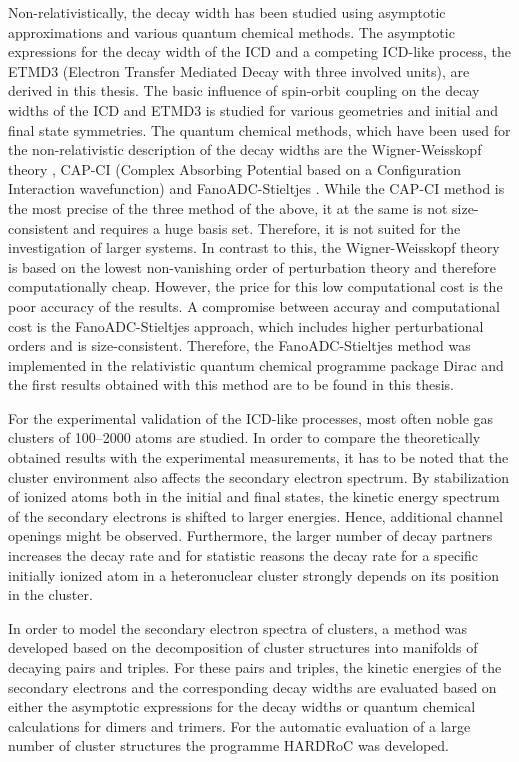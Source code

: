 Non-relativistically, the decay width has been studied using asymptotic
approximations \cite{Gokhberg10_1} and various quantum chemical methods.
The asymptotic expressions for the decay width of the \ac{ICD} and a competing
\ac{ICD}-like process, the ETMD3 (Electron Transfer Mediated Decay with three
involved units), are derived in this thesis. The basic influence of
spin-orbit coupling on the decay widths of the \ac{ICD} and ETMD3 is studied
for various geometries and initial and final state symmetries.
The quantum chemical methods, which have been used for the non-relativistic 
description of the decay widths are the Wigner-Weisskopf theory \cite{Santra02},
CAP-CI
(Complex Absorbing Potential based on a Configuration Interaction wavefunction)
\cite{SakuraiModern94,Santra01_3} and FanoADC-Stieltjes \cite{Averbukh05}.
While the CAP-CI method is the most precise of the three method of the above,
it at the same
is not size-consistent and requires a huge basis set. Therefore, it is not
suited for the investigation of larger systems. In contrast to this, the
Wigner-Weisskopf theory is based on the lowest non-vanishing order of perturbation
theory and therefore computationally cheap. However, the price for this low
computational cost is the poor accuracy of the results. A compromise between
accuray and computational cost is the FanoADC-Stieltjes approach, which includes
higher perturbational orders and is size-consistent.
Therefore, the FanoADC-Stieltjes method was implemented in the relativistic
quantum chemical programme package Dirac \cite{DIRAC13} and the first results
obtained with this method are to be found in this thesis.

For the experimental validation of the \ac{ICD}-like processes, most often
noble gas clusters of 100--2000 atoms are studied. In order to compare the
theoretically obtained results with the experimental measurements, it has
to be noted that the cluster environment also affects the secondary electron
spectrum. By stabilization of ionized atoms both in the initial and final
states, the kinetic energy spectrum of the secondary electrons is shifted to
larger energies. Hence, additional channel openings might be observed.
Furthermore, the larger number of decay partners increases the decay rate
and for statistic reasons the decay rate for a specific initially ionized
atom in a heteronuclear cluster strongly depends on its position in the cluster.

In order to model the secondary electron spectra of clusters, a method
was developed based on the decomposition of cluster structures into manifolds
of decaying pairs and triples. For these pairs and triples, the kinetic energies
of the secondary electrons and the corresponding decay widths are evaluated based
on either the asymptotic expressions for the decay widths or quantum chemical
calculations for dimers and trimers. For the automatic evaluation of
a large number of cluster structures the programme
\ac{HARDRoC} \cite{HARDRoC} was developed.


